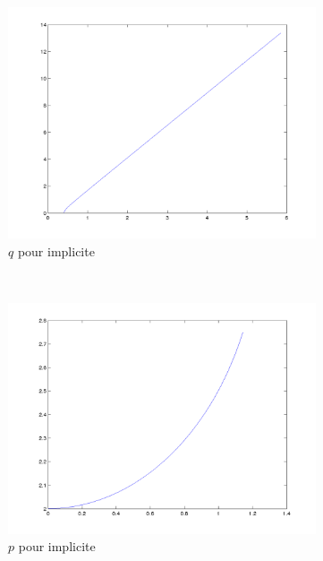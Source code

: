 \begin{figure}
  \centering
  \begin{subfigure}[b]{0.45\textwidth}
    \includegraphics[width=\textwidth]{images/Q1_implicite_q.png}
    \caption{$q$ pour implicite}
    \label{fig:q1_implicite_q}
  \end{subfigure}%
  ~ %
  \begin{subfigure}[b]{0.45\textwidth}
    \includegraphics[width=\textwidth]{images/Q1_implicite_p.png}
    \caption{$p$ pour implicite}
    \label{fig:q1_implicite_p}
  \end{subfigure}
  \begin{subfigure}[b]{0.45\textwidth}

\end{subfigure}
\end{figure}
